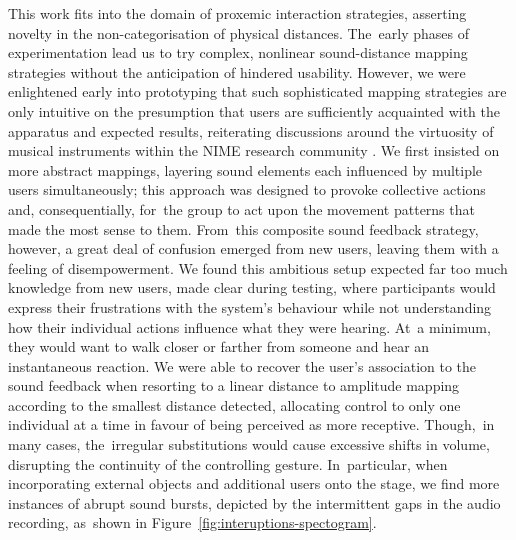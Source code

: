 This work fits into the domain of proxemic interaction strategies, asserting novelty in the non-categorisation of physical distances. The~early phases of experimentation lead us to try complex, nonlinear sound-distance mapping strategies without the anticipation of hindered usability. However, we were enlightened early into prototyping that such sophisticated mapping strategies are only intuitive on the presumption that users are sufficiently acquainted with the apparatus and expected results, reiterating discussions around the virtuosity of musical instruments within the NIME research community \citep{wu_supporting_2017}. We first insisted on more abstract mappings, layering sound elements each influenced by multiple users simultaneously; this approach was designed to provoke collective actions and, consequentially, for~the group to act upon the movement patterns that made the most sense to them. From~this composite sound feedback strategy, however, a great deal of confusion emerged from new users, leaving them with a feeling of disempowerment. We found this ambitious setup expected far too much knowledge from new users, made clear during testing, where participants would express their frustrations with the system's behaviour while not understanding how their individual actions influence what they were hearing. At~a minimum, they would want to walk closer or farther from someone and hear an instantaneous reaction. We were able to recover the user's association to the sound feedback when resorting to a linear distance to amplitude mapping according to the smallest distance detected, allocating control to only one individual at a time in favour of being perceived as more receptive. Though,~in many cases, the~irregular substitutions would cause excessive shifts in volume, disrupting the continuity of the controlling gesture. In~particular, when incorporating external objects and additional users onto the stage, we find more instances of abrupt sound bursts, depicted by the intermittent gaps in the audio recording, as~shown in Figure~\ref{fig:interuptions-spectogram}.

